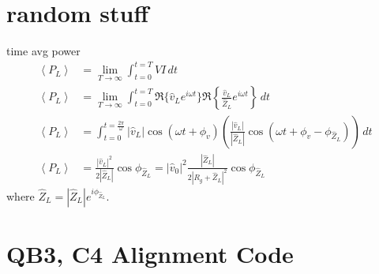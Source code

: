 \documentclass[10pt]{book}
\begin{document}
\chapter{random stuff}
time avg power
\begin{align}
\left\langle P_L \right\rangle&=\lim_{T\rightarrow \infty} \int_{t=0}^{t=T} VI\, dt\\
\left\langle P_L \right\rangle &=\lim_{T\rightarrow \infty} \int_{t=0}^{t=T} \Re\{\hat{v}_L e^{i\omega t}\}\Re \left\{ \frac{\hat{v}_L }{\hat{Z}_L}e^{i \omega t} \right\} \, dt\\
\left\langle P_L \right\rangle &=\int_{t=0}^{t=\frac{2\pi}{\omega}} \left| \hat{v}_L \right|
                                 \cos (\omega t+\phi_v)
                                \left(
                                  \frac{ \left| \hat{v}_L \right|}
                                    {\left| \hat{Z}_L \right| }
                                  \cos(\omega t +\phi_v - \phi_{\hat{Z}_L})
                                \right) \, dt\\
\left\langle P_L \right\rangle &= \frac{\left| \hat{v}_L \right|^2}{2\left| \hat{Z}_L\right|}\cos\phi_{\hat{Z}_L}=\left| \hat{v}_0 \right|^2\frac{\left| \hat{Z}_L\right|}{2\left| R_g+\hat{Z}_L\right|^2}\cos\phi_{\hat{Z}_L}\label{eq:time-avg-pwr-load}
\end{align}
where $\hat{Z}_L=\left| \hat{Z}_L \right| e^{i\phi_{\hat{Z}_L}}$.

\chapter{QB3, C4 Alignment Code}\label{appendix:qt-matlab}
%
 
\end{document}
